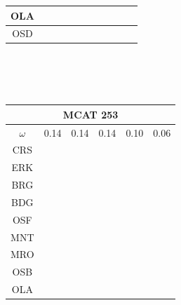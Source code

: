 \documentclass[12pt]{article}
\begin{document}
\begin{landscape}
\begin{figure}
\begin{minipage}[c]{0.3\textwidth}
\begin{tabular}{|c|c|c|c|c|c|c|c|c|c|c|}
        OLA&\cellcolor[HTML]{FF7F00}&\cellcolor[HTML]{FFFF33}&\cellcolor[HTML]{FF7F00}&\cellcolor[HTML]{FFFF33}&\cellcolor[HTML]{FF7F00}\\ \hline %
        OSD&\cellcolor[HTML]{FF7F00}&\cellcolor[HTML]{FFFF33}&\cellcolor[HTML]{FFFF33}&\cellcolor[HTML]{A65628}&\cellcolor[HTML]{FFFF33}\\ \hline %
\end{tabular}\\$~$\\$~$\\
\hspace*{-5cm}
\begin{tabular}{|c|c|c|c|c|c|} %
         \hline \multicolumn{6}{|c|}{MCAT 253} \\ \hline
         $\omega$&0.14&0.14&0.14&0.10&0.06 \\ \hline %
        CRS&\cellcolor[HTML]{E41A1C}&\cellcolor[HTML]{E41A1C}&\cellcolor[HTML]{E41A1C}&\cellcolor[HTML]{E41A1C}&\cellcolor[HTML]{E41A1C}\\ \hline %
        ERK&\cellcolor[HTML]{377EB8}&\cellcolor[HTML]{E41A1C}&\cellcolor[HTML]{E41A1C}&\cellcolor[HTML]{E41A1C}&\cellcolor[HTML]{377EB8}\\ \hline %
        BRG&\cellcolor[HTML]{4DAF4A}&\cellcolor[HTML]{377EB8}&\cellcolor[HTML]{377EB8}&\cellcolor[HTML]{377EB8}&\cellcolor[HTML]{4DAF4A}\\ \hline %
        BDG&\cellcolor[HTML]{4DAF4A}&\cellcolor[HTML]{377EB8}&\cellcolor[HTML]{377EB8}&\cellcolor[HTML]{377EB8}&\cellcolor[HTML]{4DAF4A}\\ \hline %
        OSF&\cellcolor[HTML]{984EA3}&\cellcolor[HTML]{4DAF4A}&\cellcolor[HTML]{4DAF4A}&\cellcolor[HTML]{4DAF4A}&\cellcolor[HTML]{984EA3}\\ \hline %
        MNT&\cellcolor[HTML]{984EA3}&\cellcolor[HTML]{4DAF4A}&\cellcolor[HTML]{4DAF4A}&\cellcolor[HTML]{4DAF4A}&\cellcolor[HTML]{984EA3}\\ \hline %
        MRO&\cellcolor[HTML]{984EA3}&\cellcolor[HTML]{4DAF4A}&\cellcolor[HTML]{4DAF4A}&\cellcolor[HTML]{4DAF4A}&\cellcolor[HTML]{984EA3}\\ \hline %
        OSB&\cellcolor[HTML]{FF7F00}&\cellcolor[HTML]{984EA3}&\cellcolor[HTML]{984EA3}&\cellcolor[HTML]{984EA3}&\cellcolor[HTML]{FF7F00}\\ \hline %
        OLA&\cellcolor[HTML]{FF7F00}&\cellcolor[HTML]{984EA3}&\cellcolor[HTML]{FF7F00}&\cellcolor[HTML]{984EA3}&\cellcolor[HTML]{FF7F00}\\ \hline %

\end{tabular}
\end{minipage}
\end{figure}
\end{landscape}
\end{document}
